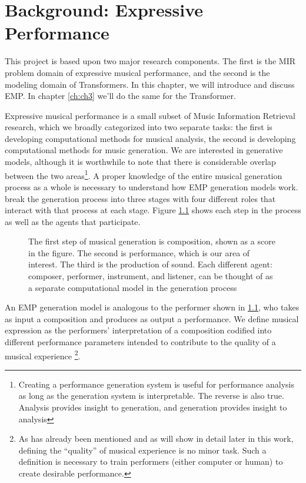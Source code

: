 \chapter{Background: Expressive Performance}\label{ch:ch2}

This project is based upon two major research components. The first is the MIR problem domain of expressive musical performance, and the second is the modeling domain of Transformers. In this chapter, we will introduce and discuss EMP. In chapter \ref{ch:ch3} we'll do the same for the Transformer. 

Expressive musical performance is a small subset of Music Information Retrieval research, which we broadly categorized into two separate tasks: the first is developing computational methods for musical analysis, the second is developing computational methods for music generation. We are interested in generative models, although it is worthwhile to note that there is considerable overlap between the two areas\footnote{Creating a performance generation system is useful for performance analysis as long as the generation system is interpretable. The reverse is also true. Analysis provides insight to generation, and generation provides insight to analysis}. A proper knowledge of the entire musical generation process as a whole is necessary to understand how EMP generation models work. \citet{ji2020comprehensive} break the generation process into three stages with four different roles that interact with that process at each stage. Figure \ref{fig:generation_process} shows each step in the process as well as the agents that participate. 

\begin{figure}
    \centering
    \caption{The first step of musical generation is composition, shown as a score in the figure. The second is performance, which is our area of interest. The third is the production of sound. Each different agent: composer, performer, instrument, and listener, can be thought of as a separate computational model in the generation process}
    \label{fig:generation_process}
\end{figure}

An EMP generation model is analogous to the performer shown in \ref{fig:generation_process}, who takes as input a composition and produces as output a performance. We define musical expression as the performers' interpretation of a composition codified into different performance parameters intended to contribute to the quality of a musical experience%
\footnote{As has already been mentioned and as will show in detail later in this work, defining the ``quality'' of musical experience is no minor task. Such a definition is necessary to train performers (either computer or human) to create desirable performance.}. 

